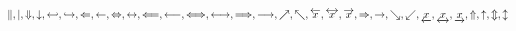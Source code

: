 $
      \Arrowvert,
      \arrowvert,
      \Downarrow,
      \downarrow,
      \hookleftarrow,
      \hookrightarrow,
      \Leftarrow,
      \leftarrow,
      \Leftrightarrow,
      \leftrightarrow,
      \Longleftarrow,
      \longleftarrow,
      \Longleftrightarrow,
      \longleftrightarrow,
      \Longrightarrow,
      \longrightarrow,
      \nearrow,
      \nwarrow,
      \overleftarrow x,
      \overleftrightarrow x,
      \overrightarrow x,
      \Rightarrow,
      \rightarrow,
      \searrow,
      \swarrow,
      \underleftarrow x,
      \underleftrightarrow x,
      \underrightarrow x,
      \Uparrow,
      \uparrow,
      \Updownarrow,
      \updownarrow
$

